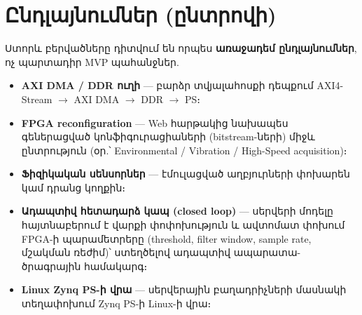 \chapter{Ընդլայնումներ (ընտրովի)}

Ստորև բերվածները դիտվում են որպես \textbf{առաջադեմ ընդլայնումներ}, ոչ պարտադիր MVP պահանջներ.

\begin{itemize}[leftmargin=1.4em]
  \item \textbf{AXI DMA / DDR ուղի} — բարձր տվյալահոսքի դեպքում AXI4-Stream
        $\rightarrow$ AXI DMA $\rightarrow$ DDR $\rightarrow$ PS։
  \item \textbf{FPGA reconfiguration} — Web հարթակից նախապես գեներացված
        կոնֆիգուրացիաների (bitstream-ների) միջև ընտրություն (օր.՝ Environmental /
        Vibration / High-Speed acquisition)։
  \item \textbf{Ֆիզիկական սենսորներ} — էմուլացված աղբյուրների փոխարեն կամ դրանց կողքին։
  \item \textbf{Ադապտիվ հետադարձ կապ (closed loop)} — սերվերի մոդելը հայտնաբերում է
        վարքի փոփոխություն և ավտոմատ փոխում FPGA-ի պարամետրերը (threshold, filter
        window, sample rate, մշակման ռեժիմ)՝ ստեղծելով ադապտիվ ապարատա-ծրագրային համակարգ։
  \item \textbf{Linux Zynq PS-ի վրա} — սերվերային բաղադրիչների մասնակի տեղափոխում Zynq PS-ի Linux-ի վրա։
\end{itemize}

